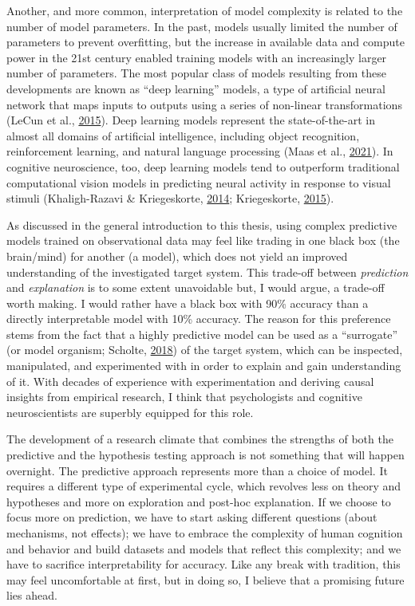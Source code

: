 \documentclass[11pt,american,a4paper,oneside,]{memoir} %
\begin{document}
Another, and more common, interpretation of model complexity is related to the number of model parameters. In the past, models usually limited the number of parameters to prevent overfitting, but the increase in available data and compute power in the 21st century enabled training models with an increasingly larger number of parameters. The most popular class of models resulting from these developments are known as ``deep learning'' models, a type of artificial neural network that maps inputs to outputs using a series of non-linear transformations (LeCun et al., \protect\hyperlink{ref-LeCun2015-xa}{2015}). Deep learning models represent the state-of-the-art in almost all domains of artificial intelligence, including object recognition, reinforcement learning, and natural language processing (Maas et al., \protect\hyperlink{ref-Van_der_Maas2021-rx}{2021}). In cognitive neuroscience, too, deep learning models tend to outperform traditional computational vision models in predicting neural activity in response to visual stimuli (Khaligh-Razavi \& Kriegeskorte, \protect\hyperlink{ref-khaligh2014deep}{2014}; Kriegeskorte, \protect\hyperlink{ref-Kriegeskorte2015-qi}{2015}).

As discussed in the general introduction to this thesis, using complex predictive models trained on observational data may feel like trading in one black box (the brain/mind) for another (a model), which does not yield an improved understanding of the investigated target system. This trade-off between \emph{prediction} and \emph{explanation} is to some extent unavoidable but, I would argue, a trade-off worth making. I would rather have a black box with 90\% accuracy than a directly interpretable model with 10\% accuracy. The reason for this preference stems from the fact that a highly predictive model can be used as a ``surrogate'' (or model organism; Scholte, \protect\hyperlink{ref-Scholte2018-he}{2018}) of the target system, which can be inspected, manipulated, and experimented with in order to explain and gain understanding of it. With decades of experience with experimentation and deriving causal insights from empirical research, I think that psychologists and cognitive neuroscientists are superbly equipped for this role.

The development of a research climate that combines the strengths of both the predictive and the hypothesis testing approach is not something that will happen overnight. The predictive approach represents more than a choice of model. It requires a different type of experimental cycle, which revolves less on theory and hypotheses and more on exploration and post-hoc explanation. If we choose to focus more on prediction, we have to start asking different questions (about mechanisms, not effects); we have to embrace the complexity of human cognition and behavior and build datasets and models that reflect this complexity; and we have to sacrifice interpretability for accuracy. Like any break with tradition, this may feel uncomfortable at first, but in doing so, I believe that a promising future lies ahead.
\end{document}
